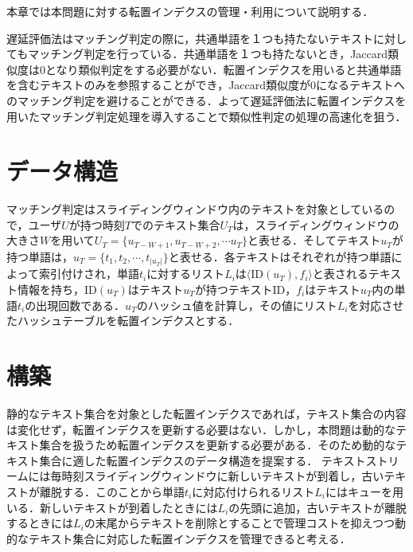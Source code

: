 \label{chap:ii}


本章では本問題に対する転置インデクスの管理・利用について説明する．

遅延評価法はマッチング判定の際に，共通単語を１つも持たないテキストに対してもマッチング判定を行っている．共通単語を１つも持たないとき，Jaccard類似度は0となり類似判定をする必要がない．転置インデクスを用いると共通単語を含むテキストのみを参照することができ，Jaccard類似度が0になるテキストへのマッチング判定を避けることができる．よって遅延評価法に転置インデクスを用いたマッチング判定処理を導入することで類似性判定の処理の高速化を狙う．

\section{データ構造}
マッチング判定はスライディングウィンドウ内のテキストを対象としているので，ユーザ$U$が持つ時刻$T$でのテキスト集合$U_T$は，スライディングウィンドウの大きさ$W$を用いて$U_T=\{u_{T-W+1}, u_{T-W+2}, \cdots u_T\}$と表せる．そしてテキスト$u_T$が持つ単語は，$u_T=\{t_1, t_2, \cdots, t_{|u_T|}\}$と表せる．各テキストはそれぞれが持つ単語によって索引付けされ，単語$t_i$に対するリスト$L_i$は$\langle\mbox{ID}(u_T), f_i\rangle$と表されるテキスト情報を持ち，$\mbox{ID}(u_T)$はテキスト$u_T$が持つテキストID，$f_i$はテキスト$u_T$内の単語$t_i$の出現回数である．$u_T$のハッシュ値を計算し，その値にリスト$L_i$を対応させたハッシュテーブルを転置インデクスとする．


\section{構築}

静的なテキスト集合を対象とした転置インデクスであれば，テキスト集合の内容は変化せず，転置インデクスを更新する必要はない．しかし，本問題は動的なテキスト集合を扱うため転置インデクスを更新する必要がある．そのため動的なテキスト集合に適した転置インデクスのデータ構造を提案する．
テキストストリームには毎時刻スライディングウィンドウに新しいテキストが到着し，古いテキストが離脱する．このことから単語$t_i$に対応付けられるリスト$L_i$にはキューを用いる．新しいテキストが到着したときには$L_i$の先頭に追加，古いテキストが離脱するときには$L_i$の末尾からテキストを削除とすることで管理コストを抑えつつ動的なテキスト集合に対応した転置インデクスを管理できると考える．

